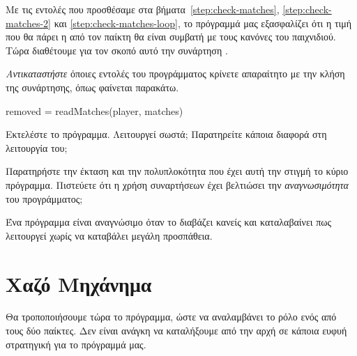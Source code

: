 \documentclass[a4paper,11pt,oneside]{book}
\begin{document}
\begin{step}
Με τις εντολές που προσθέσαμε στα βήματα~\ref{step:check-matches}, \ref{step:check-matches-2} και \ref{step:check-matches-loop}, το πρόγραμμά
μας εξασφαλίζει ότι η τιμή που θα πάρει η  από τον παίκτη θα είναι συμβατή με τους κανόνες του παιχνιδιού. Τώρα διαθέτουμε για τον σκοπό αυτό την συνάρτηση . 

\emph{Αντικαταστήστε} όποιες εντολές του προγράμματος κρίνετε απαραίτητο με την κλήση της συνάρτησης, όπως φαίνεται παρακάτω.

\begin{pynew}
removed = readMatches(player, matches)
\end{pynew}

Εκτελέστε το πρόγραμμα. Λειτουργεί σωστά; Παρατηρείτε κάποια διαφορά στη λειτουργία του;

\marginnote[14pt]{\icondiscuss}
\dottedline

Παρατηρήστε την έκταση και την πολυπλοκότητα που έχει αυτή την στιγμή το κύριο πρόγραμμα. Πιστεύετε ότι η χρήση συναρτήσεων έχει βελτιώσει την \emph{αναγνωσιμότητα} του προγράμματος;

\begin{note}
Ένα πρόγραμμα είναι αναγνώσιμο όταν το διαβάζει κανείς και καταλαβαίνει πως λειτουργεί χωρίς να καταβάλει μεγάλη προσπάθεια.
\end{note}

\marginnote[14pt]{\icondiscuss}
\dottedline

\end{step}

\section{Χαζό Μηχάνημα}
Θα τροποποιήσουμε τώρα το πρόγραμμα, ώστε να αναλαμβάνει το ρόλο ενός από τους δύο παίκτες. Δεν είναι ανάγκη να καταλήξουμε από την αρχή σε κάποια ευφυή στρατηγική για το πρόγραμμά μας.
\end{document}
